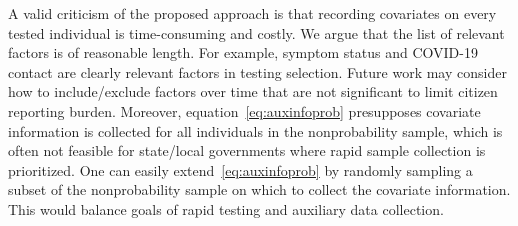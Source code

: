 \documentclass[11pt]{amsart}
\numberwithin{equation}{section}
\theoremstyle{plain}
\def\pr{\text{pr}}
\begin{document}


 A valid criticism of the proposed approach is that recording covariates on every tested individual is time-consuming and costly.  We argue that the list of relevant factors is of reasonable length.  For example, symptom status and COVID-19 contact are clearly relevant factors in testing selection.  Future work may consider how to include/exclude factors over time that are not significant to limit citizen reporting burden.  Moreover, equation~\eqref{eq:auxinfoprob} presupposes covariate information is collected for all individuals in the nonprobability sample, which is often not feasible for state/local governments where rapid sample collection is prioritized.  One can easily extend~\eqref{eq:auxinfoprob} by randomly sampling a subset of the nonprobability sample on which to collect the covariate information.
 This would balance goals of rapid testing and auxiliary data collection.

\newpage







\end{document}
